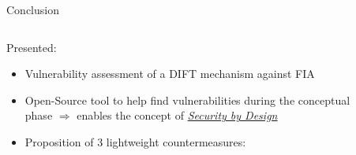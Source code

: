 \begin{frame}{Conclusion}
    \begin{columns}
        \begin{column}{.7\linewidth}
            \begin{block}{Presented:}
                \begin{itemize}
                    [triangle]
                    \item<1> Vulnerability assessment of a DIFT mechanism against FIA
                    \item<2> Open-Source tool to help find vulnerabilities during the conceptual phase $\Rightarrow$ enables the concept of \underline{\textit{Security by Design}}
                    \item<3> Proposition of 3 lightweight countermeasures:
                \end{itemize}
            \end{block}
        \end{column}
        \begin{column}{.3\linewidth}
            \begin{figure}
                \centering

\end{figure}
\end{column}
\end{columns}
\end{frame}
